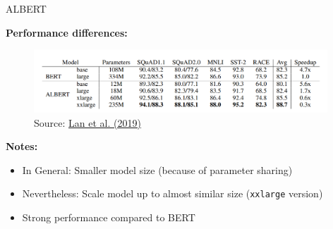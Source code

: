 \begin{frame}{ALBERT \href{https://arxiv.org/pdf/1909.11942.pdf}{}}

	\textbf{Performance differences:}

	\begin{figure}
		\centering
		\includegraphics[width = 11cm]{figure/albert-sota.png}\\ 
		\footnotesize{Source:} \href{https://arxiv.org/pdf/1907.11942.pdf}{\footnotesize Lan et al. (2019)}
	\end{figure}

	\textbf{Notes:}

	\begin{itemize}
		\item In General: Smaller model size (because of parameter sharing)
		\item Nevertheless: Scale model up to almost similar size (\texttt{xxlarge} version)
		\item Strong performance compared to BERT
	\end{itemize}
\end{frame}




\endlecture



